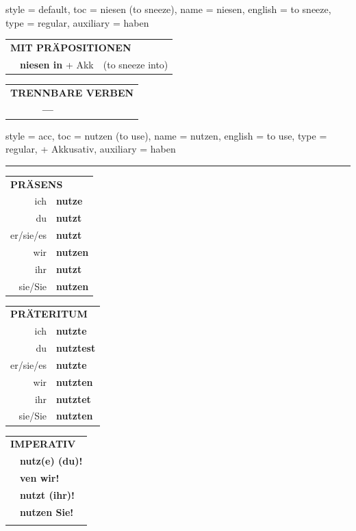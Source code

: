 \begin{verbentry}{
  style = {default},
  toc = {niesen (to sneeze)},
  name = {niesen},
  english = {to sneeze},
  type = {regular},
  auxiliary = {haben}
}
\vspace{10pt}

\begin{tabular}{lll}
\multicolumn{3}{l}{\textbf{MIT PRÄPOSITIONEN}}\\
& \textbf{niesen in} + Akk & (to sneeze into)\\
\end{tabular}
\hfill
\begin{tabular}{lll}
\multicolumn{3}{l}{\textbf{TRENNBARE VERBEN}}\\
& \textbf{---} & \\
\end{tabular}
\vspace{-5pt}
\end{verbentry}

\begin{verbentry}{
  style = {acc},
  toc = {nutzen (to use)},
  name = {nutzen},
  english = {to use},
  type = {regular, + Akkusativ},
  auxiliary = {haben}
}
 
    
     \vspace{5pt}

    \hrule
    
    \vspace{5pt}

  \begin{tabular}{rl}
     \multicolumn{2}{l}{\textbf{PRÄSENS} }\\
    ich & \textbf{nutze}\\
    du & \textbf{nutzt}\\
    er/sie/es & \textbf{nutzt}\\
    wir & \textbf{nutzen}\\
    ihr & \textbf{nutzt}\\
    sie/Sie & \textbf{nutzen}\\
  \end{tabular}
  \hfill
     \begin{tabular}{rl}
    \multicolumn{2}{l}{\textbf{PRÄTERITUM} }\\
    ich & \textbf{nutzte}\\
    du & \textbf{nutztest}\\
    er/sie/es & \textbf{nutzte}\\
    wir & \textbf{nutzten}\\
    ihr & \textbf{nutztet}\\
    sie/Sie & \textbf{nutzten}\\
  \end{tabular}
  \hfill
  \begin{tabular}{rl}
     \multicolumn{2}{l}{\textbf{IMPERATIV} }\\
   & \textbf{nutz(e) (du)!}\\
   & \textbf{ven wir!}\\
   & \textbf{nutzt (ihr)!}\\
   & \textbf{nutzen Sie!}\\
   & \vspace{10pt}
  \end{tabular}


\end{verbentry}
